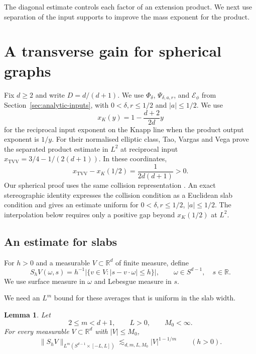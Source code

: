 \documentclass[11pt]{article}
\numberwithin{equation}{section}
\newtheorem{lemma}[theorem]{Lemma}
\newcommand{\R}{\mathbb{R}}
\newcommand{\norm}[1]{\lVert #1\rVert}
\begin{document}
The diagonal estimate controls each factor of an extension product.
We next use separation of the input supports to improve the mass
exponent for the product.


\section{A transverse gain for spherical graphs}
\label{sec:transverse}

Fix \(d\geq2\) and write \(D=d/(d+1)\).
We use \(\Phi_\delta\), \(\Psi_{\delta,a,r}\), and
\(\mathcal E_\phi\) from Section~\ref{sec:analytic-inputs}, with
\(0<\delta,r\leq1/2\) and \(|a|\leq1/2\).
We use
\[
 x_K(y)=1-\frac{d+2}{2d}y
\]
for the reciprocal input exponent on the Knapp line when the
product output exponent is \(1/y\). For their normalised elliptic
class, Tao, Vargas and Vega \cite[Theorem~2.3]{TVV} prove the
separated product estimate in \(L^2\) at reciprocal input
\(x_{\mathrm{TVV}}=3/4-1/(2(d+1))\). In these coordinates,
\[
 x_{\mathrm{TVV}}-x_K(1/2)=\frac{1}{2d(d+1)}>0 .
\]
Our spherical proof uses the same collision representation
\cite[Section~2.8]{TVV}. An exact stereographic identity expresses
the collision condition as a Euclidean slab condition and gives an
estimate uniform for \(0<\delta,r\leq1/2\), \(|a|\leq1/2\).
The interpolation
below requires only a positive gap beyond \(x_K(1/2)\) at \(L^2\).

\subsection{An estimate for slabs}

For \(h>0\) and a measurable \(V\subset\R^d\) of finite measure, define
\[
 S_h V(\omega,s)
   =h^{-1}\bigl|\{v\in V: |s-v\cdot\omega|\leq h\}\bigr|,
 \qquad \omega\in S^{d-1},\quad s\in\R.
\]
We use surface measure in \(\omega\) and Lebesgue measure in \(s\).

We need an \(L^m\) bound for these averages that is uniform in the
slab width.

\begin{lemma}\label{trans:slab}
Let
\[
 2\leq m<d+1,\qquad L>0,\qquad M_0<\infty.
\]
For every measurable \(V\subset\R^d\) with \(|V|\leq M_0\),
\[
 \norm{S_h V}_{L^m(S^{d-1}\times[-L,L])}
 \lesssim_{d,m,L,M_0}|V|^{1-1/m}
 \qquad(h>0).
\]
\end{lemma}
\end{document}
